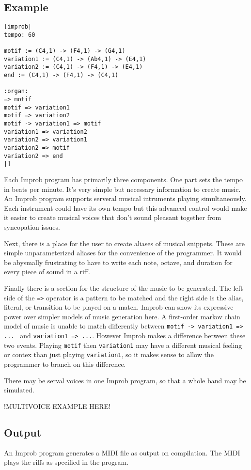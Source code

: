 \documentclass[pldi]{sigplanconf-pldi15}
\begin{document}
\subsection{Example}

\begin{verbatim}
[improb|
tempo: 60

motif := (C4,1) -> (F4,1) -> (G4,1)
variation1 := (C4,1) -> (Ab4,1) -> (E4,1)
variation2 := (C4,1) -> (F4,1) -> (E4,1)
end := (C4,1) -> (F4,1) -> (C4,1)

:organ:
=> motif
motif => variation1
motif => variation2
motif -> variation1 => motif
variation1 => variation2
variation2 => variation1
variation2 => motif
variation2 => end
|]
\end{verbatim}
Each Improb program has primarily three components. One part sets the tempo in beats per minute. It's very simple but necessary information to create music. An Improb program supports serveral musical intruments playing simultaneously. Each instrument could have its own tempo but this advanced control would make it easier to create musical voices that don't sound pleasant together from syncopation issues.

Next, there is a place for the user to create aliases of musical snippets. These are simple unparameterized aliases for the convenience of the programmer. It would be abysmally frustrating to have to write each note, octave, and duration for every piece of sound in a riff.

Finally there is a section for the structure of the music to be generated. The left side of the \texttt{=>} operator is a pattern to be matched and the right side is the alias, literal, or transition to be played on a match. Improb can show its expressive power over simpler models of music generation here. A first-order markov chain model of music is unable to match differently between \texttt{motif -> variation1 => ... } and \texttt{variation1 => ...}. However Improb makes a difference between these two events. Playing \texttt{motif} then \texttt{variation1} may have a different musical feeling or contex than just playing \texttt{variation1}, so it makes sense to allow the programmer to branch on this difference.

There may be serval voices in one Improb program, so that a whole band may be simulated.

!MULTIVOICE EXAMPLE HERE!

\subsection{Output}
An Improb program generates a MIDI file as output on compilation. The MIDI plays the riffs as specified in the program.
\end{document}
